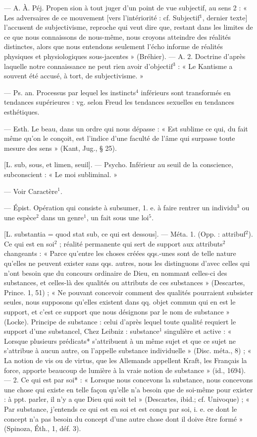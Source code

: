 \begin{itemize}[leftmargin=1cm, label=, itemsep=1pt]
 — A. À. Péj. Propen
sion à tout juger d’un point de vue
subjectif, au sens 2 : « Les adversaires de ce mouvement [vers l’intériorité : cf. Subjectif$^1$, dernier texte]
l’accusent de subjectivisme, reproche
qui veut dire que, restant dans les
limites de ce que nous connaissons
de nous-même, nous croyons atteindre des réalités distinctes, alors
que nous entendons seulement l’écho
informe de réalités physiques
et physiologiques sous-jacentes »
(Bréhier). — A. 2. Doctrine d’après
laquelle notre connaissance ne peut
rien avoir d’objectif$^3$ : « Le Kantisme a souvent été accusé, à tort,
de subjectivisme. »

 — Ps. an. Processus par
lequel les instincts$^4$ inférieurs sont
transformés en tendances supérieures : vg. selon Freud les tendances sexuelles en tendances esthétiques.

 — Esth. Le beau, dans un
ordre qui nous dépasse : « Est sublime ce qui, du fait même qu'on le
conçoit, est l'indice d’une faculté de
l’âme qui surpasse toute mesure des
sens » (Kant, Jug., § 25).

 [L. sub, sous, et limen,
seuil]. — Psycho. Inférieur au seuil
de la conscience, subconscient : « Le
moi subliminal. »

 — Voir Caractère$^1$.

 — Épist. Opération qui
consiste à subsumer, 1. e. à faire
rentrer un individu$^3$ ou une espèce$^2$
dans un genre$^1$, un fait sous une loi$^5$.

 [L. substantia = quod stat
sub, ce qui est dessous]. — Méta.
1. (Opp. : attribuf$^2$). Ce qui est en
soi$^2$ ; réalité permanente qui sert de
support aux attributs$^2$ changeants :
« Parce qu’entre les choses créées
qqs.-unes sont de telle nature qu’elles
ne peuvent exister sans qqs. autres,
nous les distinguons d’avec celles
qui n’ont besoin que du concours
ordinaire de Dieu, en nommant
celles-ci des substances, et celles-là
des qualités ou attributs de ces
substances » (Descartes, Prince.
1, 51) ; « Ne pouvant concevoir comment des qualités pourraient subsister seules, nous supposons qu’elles
existent dans qq. objet commun
qui en est le support, et c'est ce
support que nous désignons par le
nom de substance » (Locke). Principe
de substance : celui d'après lequel
toute qualité requiert le support
d'une substancel, Chez Leibniz :
substance$^1$ singulière et active :
« Lorsque plusieurs prédicats* s’attribuent à un même sujet et que ce
sujet ne s’attribue à aucun autre, on
l’appelle substance individuelle »
(Disc. méta., 8) ; « La notion de vis
ou de virtus, que les Allemands
appellent Kraft, les Français la
force, apporte beaucoup de lumière
à la vraie notion de substance »
(id., 1694). — 2. Ce qui est par soi* :
« Lorsque nous concevons la substance, nous concevons une chose
qui existe en telle façon qu’elle n’a
besoin que de soi-même pour exister :
à ppt. parler, il n’y a que Dieu qui
soit tel » (Descartes, ibid.; cf. Univoque) ; « Par substance, j'entends ce
qui est en soi et est conçu par soi,
i. e. ce dont le concept n'a pas
besoin du concept d’une autre chose
dont il doive être formé » (Spinoza,
Éth., 1, déf. 3).


\end{itemize}
